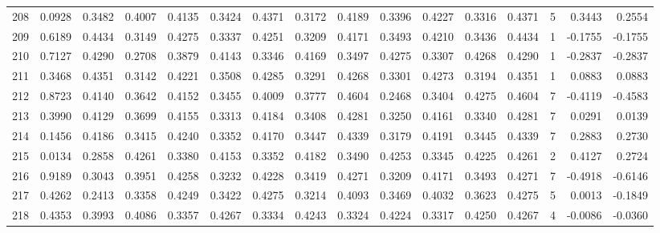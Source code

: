 \begin{tabular}{lrrrrrrrrrrrrrrr}
208 &      0.0928 &  0.3482 &  0.4007 &  0.4135 &  0.3424 &  0.4371 &  0.3172 &  0.4189 &  0.3396 &  0.4227 &   0.3316 &     0.4371 &      5 &                    0.3443 &                     0.2554 \\
209 &      0.6189 &  0.4434 &  0.3149 &  0.4275 &  0.3337 &  0.4251 &  0.3209 &  0.4171 &  0.3493 &  0.4210 &   0.3436 &     0.4434 &      1 &                   -0.1755 &                    -0.1755 \\
210 &      0.7127 &  0.4290 &  0.2708 &  0.3879 &  0.4143 &  0.3346 &  0.4169 &  0.3497 &  0.4275 &  0.3307 &   0.4268 &     0.4290 &      1 &                   -0.2837 &                    -0.2837 \\
211 &      0.3468 &  0.4351 &  0.3142 &  0.4221 &  0.3508 &  0.4285 &  0.3291 &  0.4268 &  0.3301 &  0.4273 &   0.3194 &     0.4351 &      1 &                    0.0883 &                     0.0883 \\
212 &      0.8723 &  0.4140 &  0.3642 &  0.4152 &  0.3455 &  0.4009 &  0.3777 &  0.4604 &  0.2468 &  0.3404 &   0.4275 &     0.4604 &      7 &                   -0.4119 &                    -0.4583 \\
213 &      0.3990 &  0.4129 &  0.3699 &  0.4155 &  0.3313 &  0.4184 &  0.3408 &  0.4281 &  0.3250 &  0.4161 &   0.3340 &     0.4281 &      7 &                    0.0291 &                     0.0139 \\
214 &      0.1456 &  0.4186 &  0.3415 &  0.4240 &  0.3352 &  0.4170 &  0.3447 &  0.4339 &  0.3179 &  0.4191 &   0.3445 &     0.4339 &      7 &                    0.2883 &                     0.2730 \\
215 &      0.0134 &  0.2858 &  0.4261 &  0.3380 &  0.4153 &  0.3352 &  0.4182 &  0.3490 &  0.4253 &  0.3345 &   0.4225 &     0.4261 &      2 &                    0.4127 &                     0.2724 \\
216 &      0.9189 &  0.3043 &  0.3951 &  0.4258 &  0.3232 &  0.4228 &  0.3419 &  0.4271 &  0.3209 &  0.4171 &   0.3493 &     0.4271 &      7 &                   -0.4918 &                    -0.6146 \\
217 &      0.4262 &  0.2413 &  0.3358 &  0.4249 &  0.3422 &  0.4275 &  0.3214 &  0.4093 &  0.3469 &  0.4032 &   0.3623 &     0.4275 &      5 &                    0.0013 &                    -0.1849 \\
218 &      0.4353 &  0.3993 &  0.4086 &  0.3357 &  0.4267 &  0.3334 &  0.4243 &  0.3324 &  0.4224 &  0.3317 &   0.4250 &     0.4267 &      4 &                   -0.0086 &                    -0.0360 \\

\end{tabular}

